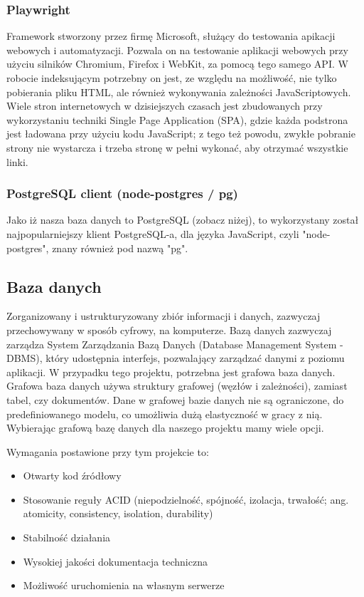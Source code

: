 \documentclass[a4paper, 12pt]{article}
\begin{document}
\subsubsection{Playwright}
Framework stworzony przez firmę Microsoft, służący do testowania apikacji webowych i automatyzacji. Pozwala on na testowanie aplikacji webowych przy użyciu silników Chromium, Firefox i WebKit, za pomocą tego samego API.\cite{playwrightReadme} W robocie indeksującym potrzebny on jest, ze względu na możliwość, nie tylko pobierania pliku HTML, ale również wykonywania zależności JavaScriptowych. Wiele stron internetowych w dzisiejszych czasach jest zbudowanych przy wykorzystaniu techniki Single Page Application (SPA), gdzie każda podstrona jest ładowana przy użyciu kodu JavaScript\cite{jsSpaOreilly}; z tego też powodu, zwykłe pobranie strony nie wystarcza i trzeba stronę w pełni wykonać, aby otrzymać wszystkie linki.
\subsubsection{PostgreSQL client (node-postgres / pg)}
Jako iż nasza baza danych to PostgreSQL (zobacz niżej), to wykorzystany został najpopularniejszy klient PostgreSQL-a, dla języka JavaScript, czyli "node-postgres", znany również pod nazwą "pg".
\subsection{Baza danych}
Zorganizowany i ustrukturyzowany zbiór informacji i danych, zazwyczaj przechowywany w sposób cyfrowy, na komputerze. Bazą danych zazwyczaj zarządza System Zarządzania Bazą Danych (Database Management System - DBMS), który udostępnia interfejs, pozwalający zarządzać danymi z poziomu aplikacji.\cite{oracleDatabase} W przypadku tego projektu, potrzebna jest grafowa baza danych. Grafowa baza danych używa struktury grafowej (węzłów i zależności), zamiast tabel, czy dokumentów. Dane w grafowej bazie danych nie są ograniczone, do predefiniowanego modelu, co umożliwia dużą elastyczność w gracy z nią.\cite{neo4jGraphDB} Wybierając grafową bazę danych dla naszego projektu mamy wiele opcji.

Wymagania postawione przy tym projekcie to:
\begin{itemize}
  \item Otwarty kod źródłowy
  \item Stosowanie reguły ACID (niepodzielność, spójność, izolacja, trwałość; ang. atomicity, consistency, isolation, durability)
  \item Stabilność działania
  \item Wysokiej jakości dokumentacja techniczna
  \item Możliwość uruchomienia na własnym serwerze
\end{itemize}
\end{document}
